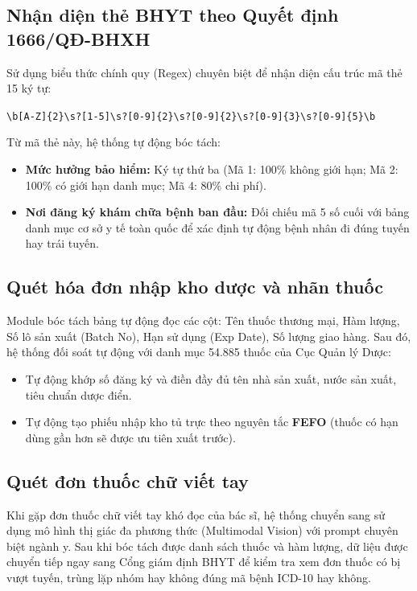 \documentclass[12pt,a4paper]{article}
\begin{document}
\subsection{Nhận diện thẻ BHYT theo Quyết định 1666/QĐ-BHXH}
Sử dụng biểu thức chính quy (Regex) chuyên biệt để nhận diện cấu trúc mã thẻ 15 ký tự:
\begin{center}
\texttt{\textbackslash b[A-Z]\{2\}\textbackslash s?[1-5]\textbackslash s?[0-9]\{2\}\textbackslash s?[0-9]\{2\}\textbackslash s?[0-9]\{3\}\textbackslash s?[0-9]\{5\}\textbackslash b}
\end{center}
Từ mã thẻ này, hệ thống tự động bóc tách:
\begin{itemize}[leftmargin=1.5em]
    \item \textbf{Mức hưởng bảo hiểm:} Ký tự thứ ba (Mã 1: 100\% không giới hạn; Mã 2: 100\% có giới hạn danh mục; Mã 4: 80\% chi phí).
    \item \textbf{Nơi đăng ký khám chữa bệnh ban đầu:} Đối chiếu mã 5 số cuối với bảng danh mục cơ sở y tế toàn quốc để xác định tự động bệnh nhân đi đúng tuyến hay trái tuyến.
\end{itemize}

\subsection{Quét hóa đơn nhập kho dược và nhãn thuốc}
Module bóc tách bảng tự động đọc các cột: Tên thuốc thương mại, Hàm lượng, Số lô sản xuất (Batch No), Hạn sử dụng (Exp Date), Số lượng giao hàng. Sau đó, hệ thống đối soát tự động với danh mục 54.885 thuốc của Cục Quản lý Dược:
\begin{itemize}[leftmargin=1.5em]
    \item Tự động khớp số đăng ký và điền đầy đủ tên nhà sản xuất, nước sản xuất, tiêu chuẩn dược điển.
    \item Tự động tạo phiếu nhập kho tủ trực theo nguyên tắc \textbf{FEFO} (thuốc có hạn dùng gần hơn sẽ được ưu tiên xuất trước).
\end{itemize}

\subsection{Quét đơn thuốc chữ viết tay}
Khi gặp đơn thuốc chữ viết tay khó đọc của bác sĩ, hệ thống chuyển sang sử dụng mô hình thị giác đa phương thức (Multimodal Vision) với prompt chuyên biệt ngành y. Sau khi bóc tách được danh sách thuốc và hàm lượng, dữ liệu được chuyển tiếp ngay sang Cổng giám định BHYT để kiểm tra xem đơn thuốc có bị vượt tuyến, trùng lặp nhóm hay không đúng mã bệnh ICD-10 hay không.
\end{document}
